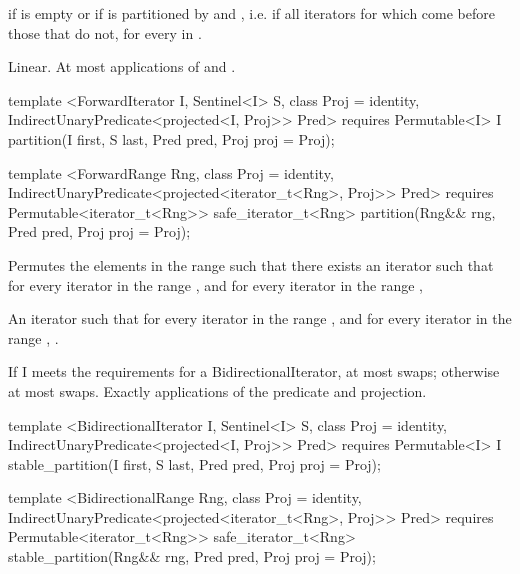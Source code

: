 \begin{itemdescr}
\pnum
\returns {} if
 is empty or if
 is partitioned by  and , i.e. if all
iterators  for which
 come before those that do not,
for every  in .

\pnum
\complexity Linear. At most  applications of  and .
\end{itemdescr}

%
\begin{itemdecl}
template <ForwardIterator I, Sentinel<I> S, class Proj = identity,
    IndirectUnaryPredicate<projected<I, Proj>> Pred>
  requires Permutable<I>
  I partition(I first, S last, Pred pred, Proj proj = Proj{});

template <ForwardRange Rng, class Proj = identity,
    IndirectUnaryPredicate<projected<iterator_t<Rng>, Proj>> Pred>
  requires Permutable<iterator_t<Rng>>
  safe_iterator_t<Rng>
    partition(Rng&& rng, Pred pred, Proj proj = Proj{});
\end{itemdecl}

\begin{itemdescr}
\pnum
\effects Permutes the elements in the range  such that there exists an iterator 
such that for every iterator  in the range 
, and for every iterator  in the
range , 

\pnum
\returns An iterator  such that for every iterator  in the range 
,
and for every iterator  in the range ,
.

\pnum
\complexity If I meets the requirements for a BidirectionalIterator, at most
 swaps; otherwise at most  swaps.
Exactly  applications of the predicate and projection.
\end{itemdescr}

%
\begin{itemdecl}
template <BidirectionalIterator I, Sentinel<I> S, class Proj = identity,
    IndirectUnaryPredicate<projected<I, Proj>> Pred>
  requires Permutable<I>
  I stable_partition(I first, S last, Pred pred, Proj proj = Proj{});

template <BidirectionalRange Rng, class Proj = identity,
    IndirectUnaryPredicate<projected<iterator_t<Rng>, Proj>> Pred>
  requires Permutable<iterator_t<Rng>>
  safe_iterator_t<Rng>
    stable_partition(Rng&& rng, Pred pred, Proj proj = Proj{});
\end{itemdecl}

